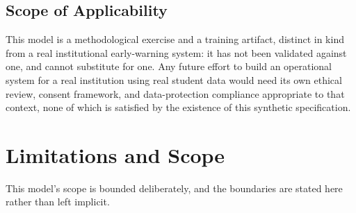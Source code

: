 \documentclass[11pt]{article}
\begin{document}
\subsection{Scope of Applicability}
\label{sec:ethics-D}

This model is a methodological exercise and a training artifact, distinct in kind from a real institutional early-warning system: it has not been validated against one, and cannot substitute for one. Any future effort to build an operational system for a real institution using real student data would need its own ethical review, consent framework, and data-protection compliance appropriate to that context, none of which is satisfied by the existence of this synthetic specification.


\FloatBarrier
\section{Limitations and Scope}
\label{sec:limitations}

This model's scope is bounded deliberately, and the boundaries are stated here rather than left implicit.
\end{document}
